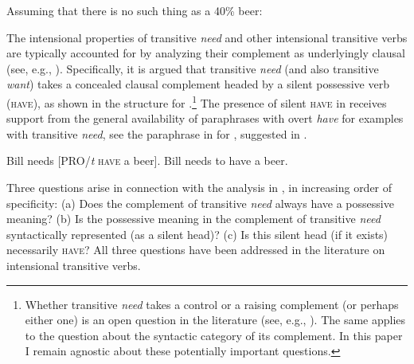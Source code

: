\documentclass[output=paper]{langscibook}
\begin{document}
\ex Assuming that there is no such thing as a 40\% beer:\\
\label{need-non-referring}
\label{need-non-referring-infinitival}
\label{non-referring-non-intensional}
\z\z

\noindent The intensional properties of transitive \textit{need} and other intensional transitive verbs are typically accounted for by analyzing their complement as underlyingly clausal (see, e.g., \citealt{denDikken.Larson.Ludlow2018,Harves2008}). Specifically, it is argued that transitive \textit{need} (and also transitive \textit{want}) takes a concealed clausal complement headed by a silent possessive verb (\textsc{have}), as shown in the structure  for .\footnote{Whether transitive \textit{need} takes a control or a raising complement (or perhaps either one) is an open question in the literature (see, e.g., \citealt{Schwarz2006,Harves2008}). The same applies to the question about the syntactic category of its complement. In this paper I remain agnostic about these potentially important questions.} The presence of silent \textsc{have} in  receives support from the general availability of paraphrases with overt \textit{have} for examples with transitive \textit{need}, see the paraphrase in  for , suggested in \citet[259]{Schwarz2006}.

\ea \label{have}
\ea Bill needs [PRO/\textit{t} \textsc{have} a beer].\label{need-have-structure}
\ex Bill needs to have a beer.\label{need-have-infinitival}
\z \z

\noindent Three questions arise in connection with the analysis in , in increasing order of specificity: (a) Does the complement of transitive \textit{need} always have a possessive meaning? (b) Is the possessive meaning in the complement of transitive \textit{need} syntactically represented (as a silent head)? (c) Is this silent head (if it exists) necessarily \textsc{have}? All three questions have been addressed in the literature on intensional transitive verbs.
\end{document}
